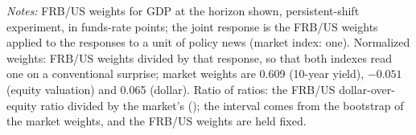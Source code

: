 \begin{table}[tbp]\centering\small
\caption{Agreement on Announcements and the Contrast in Composition}\label{tab:agree}
\begin{flushleft}\footnotesize\textit{Notes:} FRB/US weights for GDP at the horizon shown, persistent-shift experiment, in funds-rate points; the joint response is the FRB/US weights applied to the responses to a unit of policy news (market index: one). Normalized weights: FRB/US weights divided by that response, so that both indexes read one on a conventional surprise; market weights are 0.609 (10-year yield), $-0.051$ (equity valuation) and 0.065 (dollar). Ratio of ratios: the FRB/US dollar-over-equity ratio divided by the market's (); the interval comes from the bootstrap of the market weights, and the FRB/US weights are held fixed.\end{flushleft}
\end{table}

